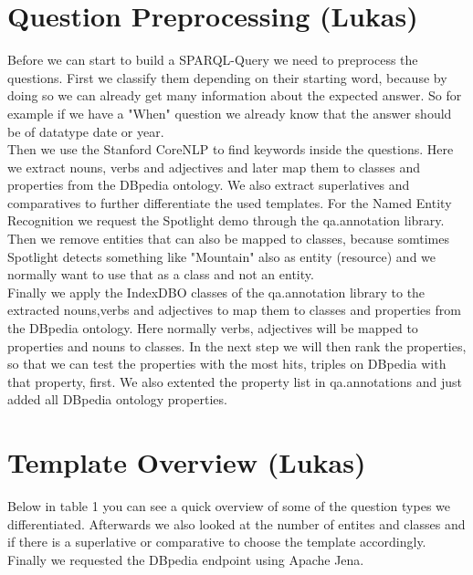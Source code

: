 \documentclass[runningheads]{llncs}
\begin{document}
\section{Question Preprocessing (Lukas)} 
Before we can start to build a SPARQL-Query we need to preprocess the questions. First we classify them depending on their starting word, because by doing so we can already get many information about the expected answer. So for example if we have a "When" question we already know that the answer should be of datatype date or year. \\

Then we use the Stanford CoreNLP \cite{stanford} to find keywords inside the questions. Here we extract nouns, verbs and adjectives and later map them to classes and properties from the DBpedia ontology. We also extract superlatives and comparatives to further differentiate the used templates. For the Named Entity Recognition we request the Spotlight \cite{spotlight} demo through the qa.annotation library. Then we remove entities that can also be mapped to classes, because somtimes Spotlight detects something like "Mountain" also as entity (resource) and we normally want to use that as a class and not an entity. \\

Finally we apply the IndexDBO classes of the qa.annotation library to the extracted nouns,verbs and adjectives to map them to classes and properties from the DBpedia ontology. Here normally verbs, adjectives will be mapped
to properties and nouns to classes. In the next step we will then rank the properties, so that we can test the properties with the most hits, triples on DBpedia with that property, first. We also extented the property list in qa.annotations and just added all DBpedia ontology properties.

\section{Template Overview (Lukas)}
Below in table 1 you can see a quick overview of some of the question types we differentiated. Afterwards we also looked at the number of entites and classes and if there is a superlative or comparative to choose the template accordingly. Finally we requested the DBpedia endpoint using Apache Jena.
\end{document}
